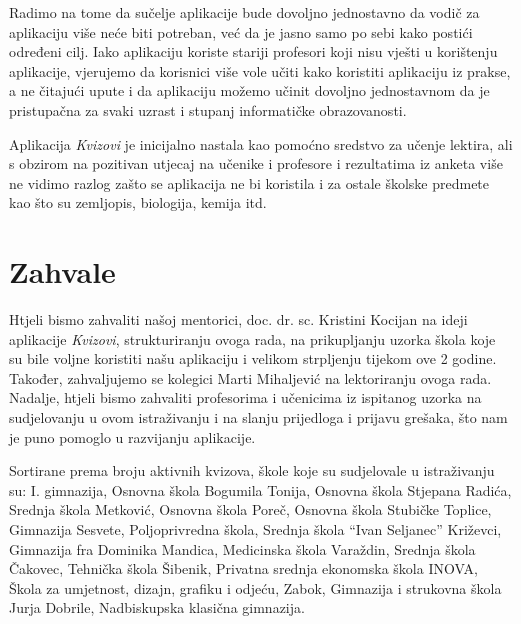\documentclass[11pt]{scrreprt}
\begin{document}
Radimo na tome da sučelje aplikacije bude dovoljno jednostavno da vodič za
aplikaciju više neće biti potreban, već da je jasno samo po sebi kako postići
određeni cilj. Iako aplikaciju koriste stariji profesori koji nisu vješti u
korištenju aplikacije, vjerujemo da korisnici više vole učiti kako koristiti
aplikaciju iz prakse, a ne čitajući upute i da aplikaciju možemo učinit dovoljno
jednostavnom da je pristupačna za svaki uzrast i stupanj informatičke
obrazovanosti.

Aplikacija \emph{Kvizovi} je inicijalno nastala kao pomoćno sredstvo za učenje
lektira, ali s obzirom na pozitivan utjecaj na učenike i profesore i rezultatima
iz anketa više ne vidimo razlog zašto se aplikacija ne bi koristila i za ostale
školske predmete kao što su zemljopis, biologija, kemija itd.

\chapter{Zahvale}

Htjeli bismo zahvaliti našoj mentorici, doc. dr. sc. Kristini Kocijan na ideji
aplikacije \emph{Kvizovi}, strukturiranju ovoga rada, na prikupljanju uzorka
škola koje su bile voljne koristiti našu aplikaciju i velikom strpljenju tijekom
ove 2 godine. Također, zahvaljujemo se kolegici Marti Mihaljević na lektoriranju
ovoga rada. Nadalje, htjeli bismo zahvaliti profesorima i učenicima iz ispitanog
uzorka na sudjelovanju u ovom istraživanju i na slanju prijedloga i prijavu
grešaka, što nam je puno pomoglo u razvijanju aplikacije.

Sortirane prema broju aktivnih kvizova, škole koje su sudjelovale u istraživanju
su: I. gimnazija, Osnovna škola Bogumila Tonija, Osnovna škola Stjepana Radića,
Srednja škola Metković, Osnovna škola Poreč, Osnovna škola Stubičke Toplice,
Gimnazija Sesvete, Poljoprivredna škola, Srednja škola ``Ivan Seljanec''
Križevci, Gimnazija fra Dominika Mandica, Medicinska škola Varaždin, Srednja
škola Čakovec, Tehnička škola Šibenik, Privatna srednja ekonomska škola INOVA,
Škola za umjetnost, dizajn, grafiku i odjeću, Zabok, Gimnazija i strukovna
škola Jurja Dobrile, Nadbiskupska klasična gimnazija.

\renewcommand{\listoffigures}{\begingroup
\tocchapter
{}
\endgroup}

\listoffigures

\renewcommand{\bibname}{Popis literature}
\end{document}
